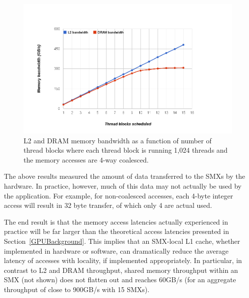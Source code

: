 \begin{figure}
\center
\includegraphics[scale=0.30]{DRAML2Bandwidth-4wayCoalesced.png}
\caption{\footnotesize\textnormal{L2 and DRAM memory bandwidth as a function of number of thread blocks where each thread
block is running 1,024 threads and the memory accesses are 4-way coalesced.
}}
\label{fig:L2-DRAM-bandwidth}
\end{figure}

The above results measured the amount of data transferred to the SMXs by the
hardware.
In practice, however, much of this data may not actually be used by the
application.
For example, for non-coalesced accesses, each 4-byte integer access will result in 32
byte transfer, of which only 4 are actual used.

The end result is that the memory access latencies actually experienced in
practice will be far larger than the theoretical access latencies presented in
Section~\ref{GPUBackground}.
This implies that an SMX-local L1 cache, whether implemented in hardware or software, can
dramatically reduce the average latency of accesses with locality, if implemented appropriately.
In particular, in contrast to L2 and DRAM throughput,  shared memory throughput within an SMX (not shown) does not flatten out and reaches 60GB/s (for an aggregate throughput of close to 900GB/s with 15 SMXs).








